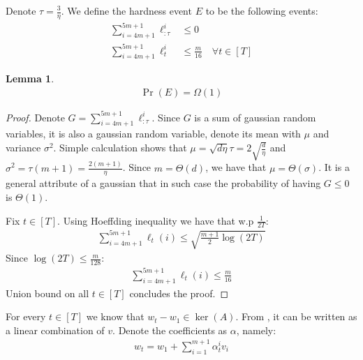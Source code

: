 \documentclass[10pt]{article}
\newtheorem{lemma}[theorem]{Lemma}
\theoremstyle{definition}
\theoremstyle{remark}
\newcommand{\roundy}[1]{ {\left( #1 \right)}}
\begin{document}
Denote $\tau=\frac{3}{\eta}$. We define the hardness event $E$ to be the following events:
\begin{align*}
    \sum_{i=4m+1}^{5m+1}\ell_{:\tau}^i &\le 0\\
    \sum_{i=4m+1}^{5m+1}\ell_t^i &\le \frac{m}{16}\quad\forall t\in[T]
\end{align*}
\begin{lemma}
\begin{align*}
    \Pr\roundy{E} = \Omega(1)
\end{align*}
\end{lemma}
\begin{proof}
Denote $G=\sum_{i=4m+1}^{5m+1}\ell_{:\tau}^i$. Since $G$ is a sum of gaussian random variables, it is also a gaussian random variable, denote its mean with $\mu$ and variance $\sigma^2$. Simple calculation shows that $\mu=\sqrt{d\eta}\tau=2\sqrt{\frac{d}{\eta}}$ and $\sigma^2=\tau(m+1)=\frac{2(m+1)}{\eta}$. Since $m=\Theta(d)$, we have that $\mu=\Theta(\sigma)$. It is a general attribute of a gaussian that in such case the probability of having $G\le 0$ is $\Theta(1)$.

Fix $t\in[T]$. Using Hoeffding inequality we have that w.p $\frac{1}{2T}$:
\begin{align*}
    \sum_{i=4m+1}^{5m+1}\ell_t(i) \le \sqrt{\frac{m+1}{2}\log\roundy{2T}}
\end{align*}
Since $\log(2T)\le \frac{m}{128}$:
\begin{align*}
    \sum_{i=4m+1}^{5m+1}\ell_t(i) \le \frac{m}{16}
\end{align*}
Union bound on all $t\in[T]$ concludes the proof.
\end{proof}

For every $t\in[T]$ we know that $w_t-w_1\in \ker(A)$. From , it can be written as a linear combination of $v$. Denote the coefficients as $\alpha$, namely:
\begin{align*}
    w_t = w_1 + \sum_{i=1}^{m+1}\alpha_t^iv_i
\end{align*}
\end{document}
